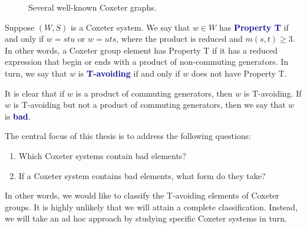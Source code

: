 \documentclass[10pt]{amsart}
\newcommand{\alert}[1]{\textcolor{darkblue}{\textbf{#1}}}
\begin{document}
\begin{figure}[h!]
\caption{Several well-known Coxeter graphs.}
\label{fig:CoxeterGraphs}
\end{figure}

Suppose $(W,S)$ is a Coxeter system.  We say that $w\in W$ has \alert{Property T} if and only if $w=stu$ or $w=uts$, where the product is reduced and $m(s,t) \geq 3$.  In other words, a Coxeter group element has Property T if it has a reduced expression that begin or ends with a product of non-commuting generators.  In turn, we say that $w$ is \alert{T-avoiding} if and only if $w$ does not have Property T.

It is clear that if $w$ is a product of commuting generators, then $w$ is T-avoiding. If $w$ is T-avoiding but not a product of commuting generators, then we say that $w$ is \alert{bad}.

The central focus of this thesis is to address the following questions:
\begin{enumerate}
\item Which Coxeter systems contain bad elements?
\item If a Coxeter system contains bad elements, what form do they take?
\end{enumerate}
In other words, we would like to classify the T-avoiding elements of Coxeter groups.  It is highly unlikely that we will attain a complete classification.  Instead, we will take an ad hoc approach by studying specific Coxeter systems in turn.
\end{document}
